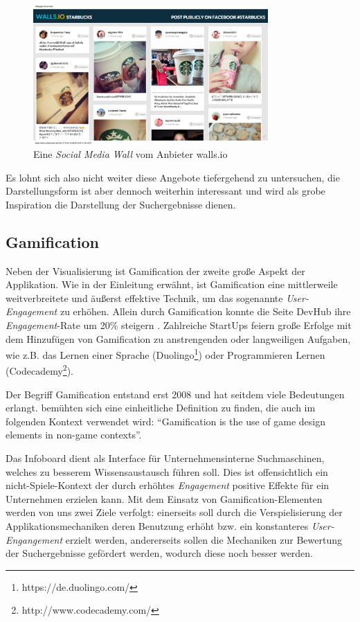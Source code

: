 \documentclass[12pt,twoside]{book}
\begin{document}
\begin{figure}[htbp]
    \centering
    \includegraphics[width=0.8\textwidth]{images/Starbucks.png}
    \caption{Eine \textit{Social Media Wall} vom Anbieter walls.io \cite{wallsio}}
    \label{fig:socialwall}
\end{figure}

Es lohnt sich also nicht weiter diese Angebote tiefergehend zu untersuchen, die Darstellungsform ist aber dennoch weiterhin interessant und wird als grobe Inspiration die Darstellung der Suchergebnisse dienen.


\subsection {Gamification}\label{sec:intro_game}

Neben der Visualisierung ist Gamification der zweite große Aspekt der Applikation. Wie in der Einleitung erwähnt, ist Gamification eine mittlerweile weitverbreitete und äußerst effektive Technik, um das sogenannte \textit{User-Engagement} zu erhöhen. Allein durch Gamification konnte die Seite DevHub ihre \textit{Engagement}-Rate um 20\% steigern \citep{zichermann2011gamification, 17}. Zahlreiche StartUps feiern große Erfolge mit dem Hinzufügen von Gamification zu anstrengenden oder langweiligen Aufgaben, wie z.B. das Lernen einer Sprache (Duolingo\footnote{https://de.duolingo.com/}) oder Programmieren Lernen (Codecademy\footnote{http://www.codecademy.com/}).

Der Begriff Gamification entstand erst 2008 und hat seitdem viele Bedeutungen erlangt. \citep{deterding2011game} bemühten sich eine einheitliche Definition zu finden, die auch im folgenden Kontext verwendet wird: ``Gamification is the use of game design elements in non-game contexts''.

Das Infoboard dient als Interface für Unternehmensinterne Suchmaschinen, welches zu besserem Wissensaustausch führen soll. Dies ist offensichtlich ein nicht-Spiele-Kontext der durch erhöhtes \textit{Engagement} positive Effekte für ein Unternehmen erzielen kann.
Mit dem Einsatz von Gamification-Elementen werden von uns zwei Ziele verfolgt: einerseits soll durch die Verspielisierung der Applikationsmechaniken deren Benutzung erhöht bzw. ein konstanteres \textit{User-Engangement} erzielt werden, andererseits sollen die Mechaniken zur Bewertung der Suchergebnisse gefördert werden, wodurch diese noch besser werden.
\end{document}
